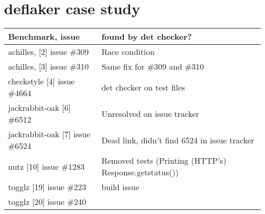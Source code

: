\section{deflaker case study}
\begin{table}[]
    \begin{tabular}{|l|l|}
        \hline
        Benchmark, issue & found by det checker? \\ \hline
        achilles, [2] issue \#309 &  Race condition\\ \hline
        achilles, [3] issue \#310 & Same fix for \#309 and \#310 \\ \hline
        checkstyle [4] issue \#4664& det checker on test files \\ \hline
        jackrabbit-oak [6] \#6512&  Unresolved on issue tracker \\ \hline
        jackrabbit-oak [7] issue \#6524&  Dead link, didn't find 6524 in issue tracker \\ \hline
        nutz [10] issue \#1283 &  Removed tests (Printing (HTTP's) Response.getstatus())\\ \hline
        togglz [19] issue \#223 & build issue \\ \hline
        togglz [20] issue \#240 &  \\ \hline
    \end{tabular}
\end{table}
